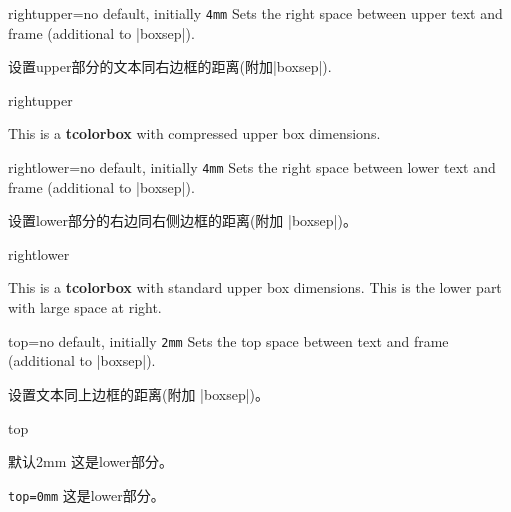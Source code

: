 \begin{docTcbKey}{rightupper}{=}{no default, initially \texttt{4mm}}
  Sets the right space between upper text and frame (additional to |boxsep|).

设置upper部分的文本同右边框的距离(附加|boxsep|).
\begin{exdispExample}{rightupper}

\begin{tcolorbox}[width=5cm,rightupper=2cm,title=My very long title text]
This is a \textbf{tcolorbox} with compressed upper box dimensions.
\end{tcolorbox}
\end{exdispExample}
\end{docTcbKey}





\begin{docTcbKey}{rightlower}{=}{no default, initially \texttt{4mm}}
  Sets the right space between lower text and frame (additional to |boxsep|).

设置lower部分的右边同右侧边框的距离(附加 |boxsep|)。
\begin{exdispExample}{rightlower}

\begin{tcolorbox}[width=5cm,rightlower=2cm]
This is a \textbf{tcolorbox} with standard upper box dimensions.
\tcblower
This is the lower part with large space at right.
\end{tcolorbox}
\end{exdispExample}
\end{docTcbKey}



\begin{docTcbKey}{top}{=}{no default, initially \texttt{2mm}}
Sets the top space between text and frame (additional to |boxsep|).

设置文本同上边框的距离(附加 |boxsep|)。
\begin{exdispExample}{top}

\begin{tcolorbox}[]
默认2mm
\tcblower
这是lower部分。
\end{tcolorbox}
\begin{tcolorbox}[top=0mm]
\verb|top=0mm|
\tcblower
这是lower部分。
\end{tcolorbox}
\end{exdispExample}
\end{docTcbKey}


